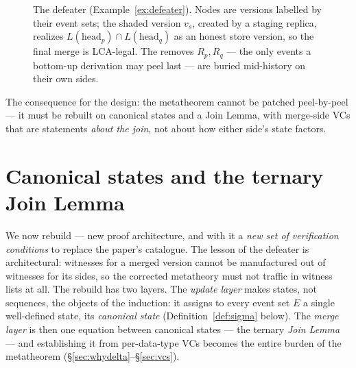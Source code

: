 \documentclass[11pt]{article}
\begin{document}
\begin{figure}[t]
\centering
{}
\caption{The defeater (Example~\ref{ex:defeater}). Nodes are
versions labelled by their event sets; the shaded version $v_s$, created
by a staging replica, realizes $L(\text{head}_p)\cap L(\text{head}_q)$ as
an honest store version, so the final merge is LCA-legal. The removes
$R_p, R_q$ --- the only events a bottom-up derivation may peel last ---
are buried mid-history on their own sides.}
\label{fig:defeater}
\end{figure}

The consequence for the design: the metatheorem cannot be patched
peel-by-peel --- it must be rebuilt on canonical states and a Join Lemma,
with merge-side VCs that are statements \emph{about the join}, not about
how either side's state factors.

\section{Canonical states and the ternary Join Lemma}
\label{sec:join}

We now rebuild --- new proof architecture, and with it a \emph{new set
of verification conditions} to replace the paper's catalogue. The lesson
of the defeater is architectural: witnesses for a merged version cannot
be manufactured out of witnesses for its sides, so the corrected
metatheory must not traffic in witness lists at all. The rebuild has two
layers. The \emph{update layer} makes states, not sequences, the objects
of the induction: it assigns to every event set $E$ a single
well-defined state, its \emph{canonical state}
(Definition~\ref{def:sigma} below). The \emph{merge layer} is then one
equation between canonical states --- the ternary \emph{Join Lemma} ---
and establishing it from per-data-type VCs becomes the entire burden of
the metatheorem (\S\ref{sec:whydelta}--\S\ref{sec:vcs}).
\end{document}
